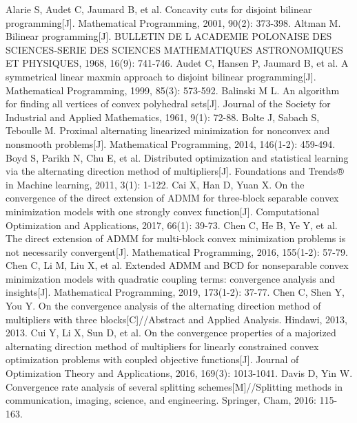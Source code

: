 \documentclass[UTF8,10.5pt,a4paper]{ctexart}
\theoremstyle{definition}
\theoremstyle{definition}
\begin{document}
\begin{thebibliography}{MM}
	\addtolength{\itemsep}{-0.5em}
	\begin{small}
		 Alarie S, Audet C, Jaumard B, et al. Concavity cuts for disjoint bilinear programming[J]. Mathematical Programming, 2001, 90(2): 373-398.
		 Altman M. Bilinear programming[J]. BULLETIN DE L ACADEMIE POLONAISE DES SCIENCES-SERIE DES SCIENCES MATHEMATIQUES ASTRONOMIQUES ET PHYSIQUES, 1968, 16(9): 741-746.
		 Audet C, Hansen P, Jaumard B, et al. A symmetrical linear maxmin approach to disjoint bilinear programming[J]. Mathematical Programming, 1999, 85(3): 573-592.
		 Balinski M L. An algorithm for finding all vertices of convex polyhedral sets[J]. Journal of the Society for Industrial and Applied Mathematics, 1961, 9(1): 72-88.
		 Bolte J, Sabach S, Teboulle M. Proximal alternating linearized minimization for nonconvex and nonsmooth problems[J]. Mathematical Programming, 2014, 146(1-2): 459-494.
		 Boyd S, Parikh N, Chu E, et al. Distributed optimization and statistical learning via the alternating direction method of multipliers[J]. Foundations and Trends® in Machine learning, 2011, 3(1): 1-122.
		 Cai X, Han D, Yuan X. On the convergence of the direct extension of ADMM for three-block separable convex minimization models with one strongly convex function[J]. Computational Optimization and Applications, 2017, 66(1): 39-73.
		 Chen C, He B, Ye Y, et al. The direct extension of ADMM for multi-block convex minimization problems is not necessarily convergent[J]. Mathematical Programming, 2016, 155(1-2): 57-79.
		 Chen C, Li M, Liu X, et al. Extended ADMM and BCD for nonseparable convex minimization models with quadratic coupling terms: convergence analysis and insights[J]. Mathematical Programming, 2019, 173(1-2): 37-77.
		 Chen C, Shen Y, You Y. On the convergence analysis of the alternating direction method of multipliers with three blocks[C]//Abstract and Applied Analysis. Hindawi, 2013, 2013.
		 Cui Y, Li X, Sun D, et al. On the convergence properties of a majorized alternating direction method of multipliers for linearly constrained convex optimization problems with coupled objective functions[J]. Journal of Optimization Theory and Applications, 2016, 169(3): 1013-1041.
		 Davis D, Yin W. Convergence rate analysis of several splitting schemes[M]//Splitting methods in communication, imaging, science, and engineering. Springer, Cham, 2016: 115-163.

\end{small}
\end{thebibliography}
\end{document}

